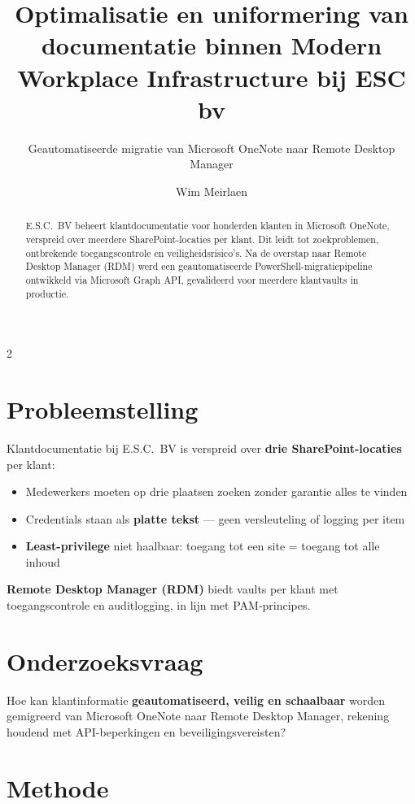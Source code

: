 \documentclass[a0,portrait]{hogent-poster}
\title{Optimalisatie en uniformering van documentatie binnen Modern Workplace Infrastructure bij ESC bv}
\subtitle{Geautomatiseerde migratie van Microsoft OneNote naar Remote Desktop Manager}
\author{Wim Meirlaen}
\begin{document}
\maketitle

\begin{abstract}
E.S.C.\ BV beheert klantdocumentatie voor honderden klanten in Microsoft OneNote, verspreid over meerdere SharePoint-locaties per klant. Dit leidt tot zoekproblemen, ontbrekende toegangscontrole en veiligheidsrisico's. Na de overstap naar Remote Desktop Manager (RDM) werd een geautomatiseerde PowerShell-migratiepipeline ontwikkeld via Microsoft Graph API, gevalideerd voor meerdere klantvaults in productie.
\end{abstract}

\begin{multicols}{2}

\section{Probleemstelling}

Klantdocumentatie bij E.S.C.\ BV is verspreid over \textbf{drie SharePoint-locaties} per klant:

\begin{itemize}
  \item Medewerkers moeten op drie plaatsen zoeken zonder garantie alles te vinden
  \item Credentials staan als \textbf{platte tekst} — geen versleuteling of logging per item
  \item \textbf{Least-privilege} niet haalbaar: toegang tot een site = toegang tot alle inhoud
\end{itemize}

\textbf{Remote Desktop Manager (RDM)} biedt vaults per klant met toegangscontrole en auditlogging, in lijn met PAM-principes.

\section{Onderzoeksvraag}

Hoe kan klantinformatie \textbf{geautomatiseerd, veilig en schaalbaar} worden gemigreerd van Microsoft OneNote naar Remote Desktop Manager, rekening houdend met API-beperkingen en beveiligingsvereisten?

\section{Methode}


\end{multicols}
\end{document}
